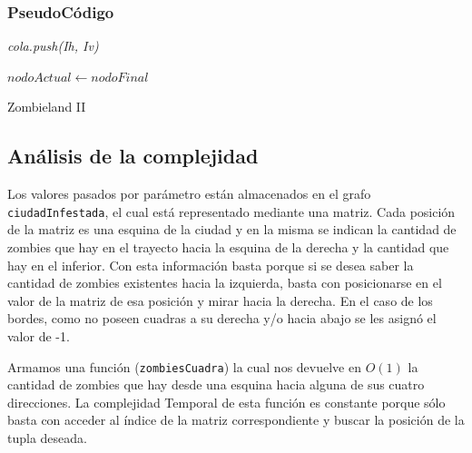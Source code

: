 \subsubsection*{PseudoC\'odigo}

\IncMargin{1em}
\begin{algorithm}
\BlankLine
\BlankLine
\emph{cola.push(Ih, Iv)}\;

	\emph{$nodoActual \leftarrow nodoFinal$}\;
\;



\caption{Zombieland II}%
\end{algorithm}\DecMargin{1em}

\newpage
\subsection{An\'alisis de la complejidad}

Los valores pasados por par\'ametro est\'an almacenados en el grafo \texttt{ciudadInfestada}, el cual est\'a representado mediante una matriz. Cada posici\'on de la matriz es una esquina de la ciudad y en la misma se indican la cantidad de zombies que hay en el trayecto hacia la esquina de la derecha y la cantidad que hay en el inferior. Con esta informaci\'on basta porque si se desea saber la cantidad de zombies existentes hacia la izquierda, basta con posicionarse en el valor de la matriz de esa posici\'on y mirar hacia la derecha. En el caso de los bordes, como no poseen cuadras a su derecha y/o hacia abajo se les asign\'o el valor de -1.

Armamos una funci\'on (\texttt{zombiesCuadra}) la cual nos devuelve en $O(1)$ la cantidad de zombies que hay desde una esquina hacia alguna de sus cuatro direcciones. La complejidad Temporal de esta funci\'on es constante porque s\'olo basta con acceder al \'indice de la matriz correspondiente y buscar la posici\'on de la tupla deseada.\\
\\

